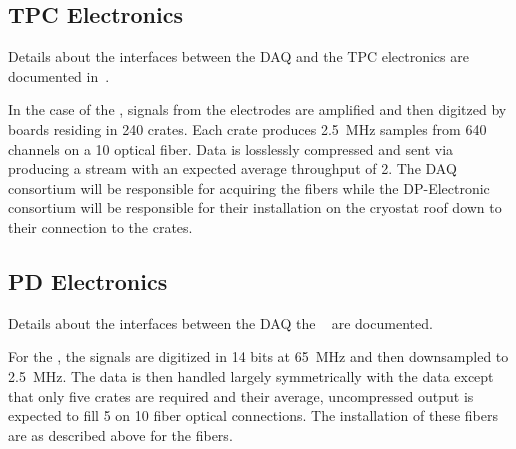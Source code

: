 
\subsection{TPC Electronics}
\label{sec:fd-daq-intfc-elec}

Details about the interfaces between the DAQ and the 
 TPC electronics are documented in~\cite{docdb6778}.

In the case of the  , signals from the
 electrodes are amplified and then digitzed by 
boards residing in 240  crates. 
Each crate produces \SI{2.5}{\MHz} samples from 640 channels on a
\SI{10}{\Gbps} optical fiber. 
Data is losslessly compressed and sent via  producing a
stream with an expected average throughput of \SI{2}{\Gbps}.
The DAQ consortium will be responsible for acquiring the fibers while
the DP-Electronic consortium will be responsible for their
installation on the cryostat roof down to their connection to the
 crates.


\subsection{PD Electronics}
\label{sec:fd-daq-intfc-photon}

Details about the interfaces between the DAQ the 
~\cite{docdb6802} are documented. 


For the  , the signals are digitized in 14 bits
at \SI{65}{\MHz} and then downsampled to \SI{2.5}{\MHz}. 
The data is then handled largely symmetrically with the 
data except that only five  crates are required and their
average, uncompressed output is expected to fill \SI{5}{\Gbps} on
\SI{10}{\Gbps} fiber optical connections. 
The installation of these fibers are as described above for the
 fibers.


